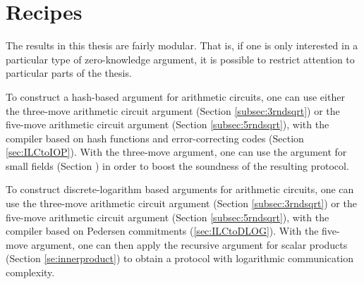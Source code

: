 %

\section{Recipes} The results in this thesis are fairly modular. That is, if one is only interested in a particular type of zero-knowledge argument, it is possible to restrict attention to particular parts of the thesis.

To construct a hash-based argument for arithmetic circuits, one can use either the three-move arithmetic circuit argument (Section \ref{subsec:3rndsqrt}) or the five-move arithmetic circuit argument (Section \ref{subsec:5rndsqrt}), with the compiler based on hash functions and error-correcting codes (Section \ref{sec:ILCtoIOP}). With the three-move argument, one can use the argument for small fields (Section \label{sec:fieldext}) in order to boost the soundness of the resulting protocol.

To construct discrete-logarithm based arguments for arithmetic circuits, one can use the three-move arithmetic circuit argument (Section \ref{subsec:3rndsqrt}) or the five-move arithmetic circuit argument (Section \ref{subsec:5rndsqrt}), with the compiler based on Pedersen commitments (\ref{sec:ILCtoDLOG}). With the five-move argument, one can then apply the recursive argument for scalar products (Section \ref{se:innerproduct}) to obtain a protocol with logarithmic communication complexity.

